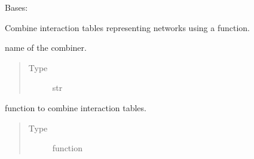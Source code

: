 \documentclass[letterpaper,10pt,english]{sphinxmanual}
\begin{document}
\begin{fulllineitems}
\label{\detokenize{_modules/cosifer.combiners:cosifer.combiners.cit.CombineInteractionTables}}
Bases: {\hyperref[\detokenize{_modules/cosifer.combiners:cosifer.combiners.network_combiner.NetworkCombiner}]{}}

Combine interaction tables representing networks using a function.

\begin{fulllineitems}
\label{\detokenize{_modules/cosifer.combiners:cosifer.combiners.cit.CombineInteractionTables.name}}
name of the combiner.
\begin{quote}\begin{description}
\item[{Type}] \leavevmode
str

\end{description}\end{quote}

\end{fulllineitems}


\begin{fulllineitems}
\label{\detokenize{_modules/cosifer.combiners:cosifer.combiners.cit.CombineInteractionTables.combine_tables}}
function to combine interaction tables.
\begin{quote}\begin{description}
\item[{Type}] \leavevmode
function

\end{description}\end{quote}


\end{fulllineitems}
\end{fulllineitems}
\end{document}

